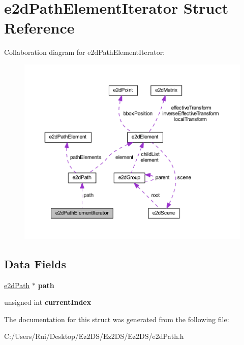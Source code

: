 \hypertarget{structe2d_path_element_iterator}{\section{e2d\-Path\-Element\-Iterator Struct Reference}
\label{structe2d_path_element_iterator}
}


Collaboration diagram for e2d\-Path\-Element\-Iterator\-:\nopagebreak
\begin{figure}[H]
\begin{center}
\leavevmode
\includegraphics[width=350pt]{structe2d_path_element_iterator__coll__graph}
\end{center}
\end{figure}
\subsection*{Data Fields}
\begin{DoxyCompactItemize}
\item 
\hypertarget{structe2d_path_element_iterator_a318773d3a24970f193ecb5e2fcdce1a7}{\hyperlink{structe2d_path}{e2d\-Path} $\ast$ {\bfseries path}}\label{structe2d_path_element_iterator_a318773d3a24970f193ecb5e2fcdce1a7}

\item 
\hypertarget{structe2d_path_element_iterator_a932f59c8e81a171eb21af8d204d1c13d}{unsigned int {\bfseries current\-Index}}\label{structe2d_path_element_iterator_a932f59c8e81a171eb21af8d204d1c13d}

\end{DoxyCompactItemize}


The documentation for this struct was generated from the following file\-:\begin{DoxyCompactItemize}
\item 
C\-:/\-Users/\-Rui/\-Desktop/\-Ez2\-D\-S/\-Ez2\-D\-S/\-Ez2\-D\-S/e2d\-Path.\-h\end{DoxyCompactItemize}
